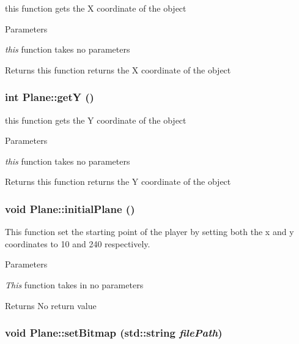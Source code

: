 this function gets the X coordinate of the object 
\begin{DoxyParams}{Parameters}
\item[{\em this}]function takes no parameters \end{DoxyParams}
\begin{DoxyReturn}{Returns}
this function returns the X coordinate of the object 
\end{DoxyReturn}
\hypertarget{classPlane_a8c754851771ba75ecd163a55d2f31800}{
\subsubsection[{getY}]{\setlength{\rightskip}{0pt plus 5cm}int Plane::getY ()}}
\label{classPlane_a8c754851771ba75ecd163a55d2f31800}


this function gets the Y coordinate of the object 
\begin{DoxyParams}{Parameters}
\item[{\em this}]function takes no parameters \end{DoxyParams}
\begin{DoxyReturn}{Returns}
this function returns the Y coordinate of the object 
\end{DoxyReturn}
\hypertarget{classPlane_a6f961e4c2c03b03bac2bd61749ec51e1}{
\subsubsection[{initialPlane}]{\setlength{\rightskip}{0pt plus 5cm}void Plane::initialPlane ()}}
\label{classPlane_a6f961e4c2c03b03bac2bd61749ec51e1}


This function set the starting point of the player by setting both the x and y coordinates to 10 and 240 respectively. 
\begin{DoxyParams}{Parameters}
\item[{\em This}]function takes in no parameters \end{DoxyParams}
\begin{DoxyReturn}{Returns}
No return value 
\end{DoxyReturn}
\hypertarget{classPlane_a41fc70cf581d5f3d5efaba227d0b406b}{
\subsubsection[{setBitmap}]{\setlength{\rightskip}{0pt plus 5cm}void Plane::setBitmap (std::string {\em filePath})}}
\label{classPlane_a41fc70cf581d5f3d5efaba227d0b406b}


